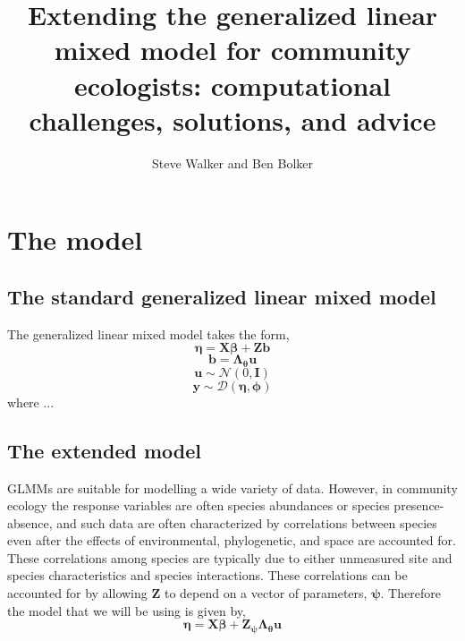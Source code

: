 \documentclass{article}
\title{Extending the generalized linear mixed model for community
  ecologists: computational challenges, solutions, and advice}
\author{Steve Walker and Ben Bolker}
\date{}
\newcommand{\mat}{\bm}
\newcommand{\trans}{^\top}
\newcommand{\dnorm}{\mathcal{N}}
\newcommand{\dexpfam}{\mathcal{D}}
\begin{document}
\maketitle



\section{The model}

\subsection{The standard generalized linear mixed model}

The generalized linear mixed model takes the form,
\begin{equation}
  \label{eq:6}
  \bm\eta = \bm X\bm\beta + \bm Z\bm b
\end{equation}
\begin{equation}
  \label{eq:10}
  \bm b = \bm\Lambda_{\bm\theta}\bm u
\end{equation}
\begin{equation}
  \label{eq:7}
  \bm u \sim \dnorm(0, \bm I)
\end{equation}
\begin{equation}
  \label{eq:8}
  \bm y \sim \dexpfam (\bm\eta, \bm\phi)
\end{equation}
where ...  

\subsection{The extended model}

GLMMs are suitable for modelling a wide variety of data.  However, in
community ecology the response variables are often species abundances
or species presence-absence, and such data are often characterized by
correlations between species even after the effects of environmental,
phylogenetic, and space are accounted for.  These correlations among
species are typically due to either unmeasured site and species
characteristics and species interactions.  These correlations can be
accounted for by allowing $\bm Z$ to depend on a vector of parameters,
$\bm\psi$.  Therefore the model that we will be using is given by,
\begin{equation}
  \label{eq:6}
  \bm\eta = \bm X\bm\beta + \bm Z_{\bm\psi}\bm\Lambda_{\bm\theta}\bm u
\end{equation}
\end{document}
